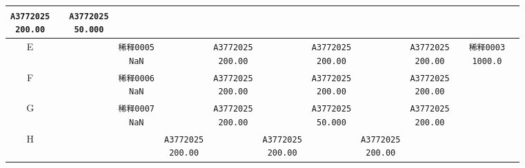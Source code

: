 \documentclass[UTF8,10pt,a4paper,fontset=fandol]{ctexart}
\newcommand{\fieldvalue}[1]{#1}
\begin{document}
\begin{center}
\begin{tabular}{c|*{12}{c|}}
\fieldvalue{\texttt{A3772025\\200.00}}&&
\fieldvalue{\texttt{A3772025\\50.000}}&&&&\\ \hline
E&&&
\fieldvalue{\texttt{稀释0005\\NaN}}&&
\fieldvalue{\texttt{A3772025\\200.00}}&&
\fieldvalue{\texttt{A3772025\\200.00}}&&
\fieldvalue{\texttt{A3772025\\200.00}}&&
\fieldvalue{\texttt{稀释0003\\1000.0}}\\ \hline
F&&&
\fieldvalue{\texttt{稀释0006\\NaN}}&&
\fieldvalue{\texttt{A3772025\\200.00}}&&
\fieldvalue{\texttt{A3772025\\200.00}}&&
\fieldvalue{\texttt{A3772025\\200.00}}&&&&\\ \hline
G&&&
\fieldvalue{\texttt{稀释0007\\NaN}}&&
\fieldvalue{\texttt{A3772025\\200.00}}&&
\fieldvalue{\texttt{A3772025\\50.000}}&&
\fieldvalue{\texttt{A3772025\\200.00}}&&&&\\ \hline
H&&&&
\fieldvalue{\texttt{A3772025\\200.00}}&&
\fieldvalue{\texttt{A3772025\\200.00}}&&
\fieldvalue{\texttt{A3772025\\200.00}}&&&&\\ \hline
\end{tabular}
\end{center}
\end{document}
